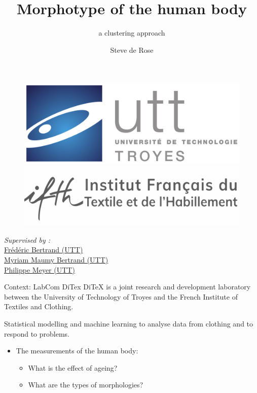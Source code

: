 \documentclass[10pt]{beamer}
\author{Steve de Rose}
\title{Morphotype of the human body}
\subtitle{a clustering approach}
\date{}
\begin{document}
\begin{frame}
	
	\begin{figure}[H]
		\begin{minipage}{0.48\textwidth}
			\centering
			\includegraphics[width=.5\linewidth]{../Images/Logo_UTT.png}
		\end{minipage}\hfill
		\begin{minipage}{0.48\textwidth}
			\centering
			\includegraphics[width=.5\linewidth]{../Images/ifth_retina.png}
		\end{minipage}
	\end{figure}
	\maketitle

	\begin{center}
		\footnotesize
		\textit{Supervised by :}\\
		\href{mailto:frederic.bertrand@utt.fr}{Frédéric Bertrand (UTT)}\\
		\href{mailto:myriam.maumy@utt.fr}{Myriam Maumy Bertrand (UTT)}\\
		\href{mailto:philippe.meyer@utt.fr}{Philippe Meyer (UTT)}\\
	\end{center}
\end{frame}

\begin{frame}{Context: LabCom DiTex}
	DiTeX is a joint research and development laboratory between the University of Technology of Troyes and the French Institute of Textiles and Clothing.
	\vspace{5mm}

	\begin{block}{Statistical modelling and machine learning to analyse data from clothing and to respond to problems.}
		\begin{itemize}
			\item The measurements of the human body:
			      \begin{itemize}
				      \item What is the effect of ageing?
				      \item What are the types of morphologies?
			      \end{itemize}
		\end{itemize}
	\end{block}
\end{frame}
\end{document}
